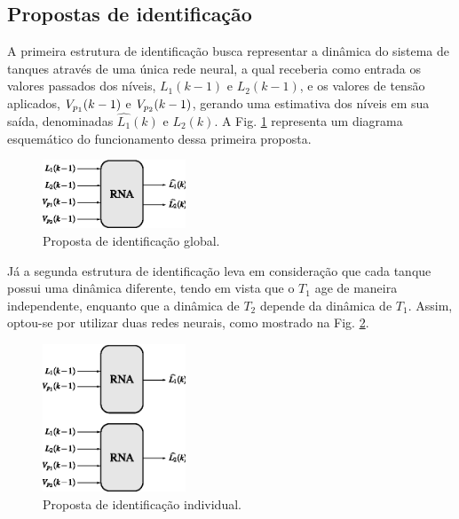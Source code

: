 \subsection{Propostas de identificação}
A primeira estrutura de identificação busca representar a dinâmica do sistema de
tanques através de uma única rede neural, a qual receberia como entrada os
valores passados dos níveis, $L_1(k-1)$ e $L_2(k-1)$, e os valores de tensão
aplicados, $V_{p_{\tiny 1}}(k-1)$ e $V_{p_{\tiny 2}}(k-1)$, gerando uma
estimativa dos níveis em sua saída, denominadas $\widehat{L_1}(k)$ e
$\widehat{L_2}(k)$.  A Fig. \ref{fig:ident_proposta_1} representa um diagrama
esquemático do funcionamento dessa primeira proposta.

\begin{figure}[htb]
\centering
    \includegraphics[width=0.38\textwidth]{imgs/sistema/eps/ident_proposta_1}
    \caption{Proposta de identificação global.}
    \label{fig:ident_proposta_1}
\end{figure}

Já a segunda estrutura de identificação leva em consideração que cada tanque
possui uma dinâmica diferente, tendo em vista que o $T_1$ age de maneira
independente, enquanto que a dinâmica de $T_2$ depende da dinâmica de $T_1$.
Assim, optou-se por utilizar duas redes neurais, como mostrado na Fig.
\ref{fig:ident_proposta_2}.

\begin{figure}[htb]
\centering
    \includegraphics[width=0.38\textwidth]{imgs/sistema/eps/ident_proposta_2}
    \caption{Proposta de identificação individual.}
    \label{fig:ident_proposta_2}
\end{figure}

